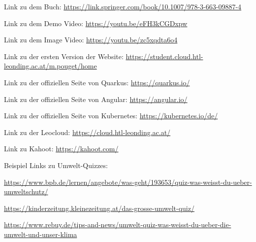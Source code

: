 

Link zu dem Buch: \href{https://link.springer.com/book/10.1007/978-3-663-09887-4}{https://link.springer.com/book/10.1007/978-3-663-09887-4}


Link zu dem Demo Video: \href{https://youtu.be/eFH3kCGDxpw}{https://youtu.be/eFH3kCGDxpw}

Link zu dem Image Video: \href{https://youtu.be/zc5xqdta6o4}{https://youtu.be/zc5xqdta6o4}

Link zu der ersten Version der Website: \href{https://student.cloud.htl-leonding.ac.at/m.pouget/home}{https://student.cloud.htl-leonding.ac.at/m.pouget/home}

Link zu der offiziellen Seite von Quarkus: \href{https://quarkus.io/}{https://quarkus.io/}

Link zu der offiziellen Seite von Angular: \href{https://angular.io/}{https://angular.io/}

Link zu der offiziellen Seite von Kubernetes: \href{https://kubernetes.io/de/}{https://kubernetes.io/de/}

Link zu der Leocloud: \href{https://cloud.htl-leonding.ac.at/}{https://cloud.htl-leonding.ac.at/}

Link zu Kahoot: \href{https://kahoot.com/}{https://kahoot.com/}

Beispiel Links zu Umwelt-Quizzes:

\href{https://www.bpb.de/lernen/angebote/was-geht/193653/quiz-was-weisst-du-ueber-umweltschutz/}{https://www.bpb.de/lernen/angebote/was-geht/193653/quiz-was-weisst-du-ueber-umweltschutz/}

\href{https://kinderzeitung.kleinezeitung.at/das-grosse-umwelt-quiz/}{https://kinderzeitung.kleinezeitung.at/das-grosse-umwelt-quiz/}

\href{https://www.rebuy.de/tips-and-news/umwelt-quiz-was-weisst-du-ueber-die-umwelt-und-unser-klima}{https://www.rebuy.de/tips-and-news/umwelt-quiz-was-weisst-du-ueber-die-umwelt-und-unser-klima}


